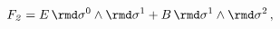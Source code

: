 \begin{equation} \label{fluxes}
 F_{\it 2}=E\, \rmd \sigma^0 \wedge \rmd \sigma^1
 + B\, \rmd \sigma^1 \wedge \rmd \sigma^2\,,
\end{equation}

